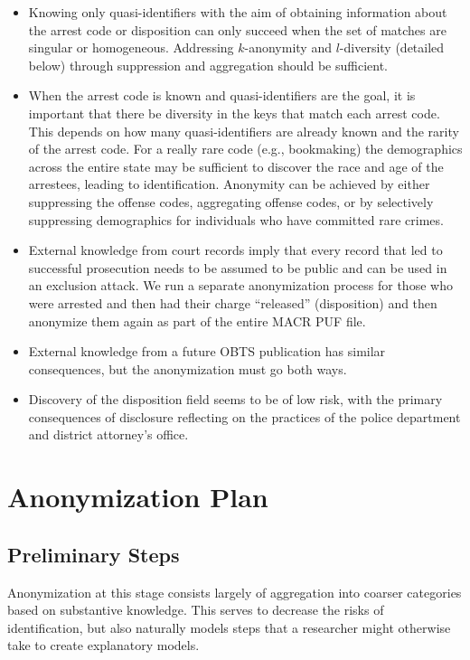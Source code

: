 \documentclass[]{article}
\providecommand{\tightlist}{%
  \setlength{\itemsep}{0pt}\setlength{\parskip}{0pt}}
\begin{document}
\begin{itemize}
\tightlist
\item
  Knowing only quasi-identifiers with the aim of obtaining information
  about the arrest code or disposition can only succeed when the set of
  matches are singular or homogeneous. Addressing \(k\)-anonymity and
  \(l\)-diversity (detailed below) through suppression and aggregation
  should be sufficient.
\item
  When the arrest code is known and quasi-identifiers are the goal, it
  is important that there be diversity in the keys that match each
  arrest code. This depends on how many quasi-identifiers are already
  known and the rarity of the arrest code. For a really rare code (e.g.,
  bookmaking) the demographics across the entire state may be sufficient
  to discover the race and age of the arrestees, leading to
  identification. Anonymity can be achieved by either suppressing the
  offense codes, aggregating offense codes, or by selectively
  suppressing demographics for individuals who have committed rare
  crimes.
\item
  External knowledge from court records imply that every record that led
  to successful prosecution needs to be assumed to be public and can be
  used in an exclusion attack. We run a separate anonymization process
  for those who were arrested and then had their charge ``released''
  (disposition) and then anonymize them again as part of the entire MACR
  PUF file.
\item
  External knowledge from a future OBTS publication has similar
  consequences, but the anonymization must go both ways.
\item
  Discovery of the disposition field seems to be of low risk, with the
  primary consequences of disclosure reflecting on the practices of the
  police department and district attorney's office.
\end{itemize}

\section{Anonymization Plan}\label{anonymization-plan}

\subsection{Preliminary Steps}\label{preliminary-steps}

Anonymization at this stage consists largely of aggregation into coarser
categories based on substantive knowledge. This serves to decrease the
risks of identification, but also naturally models steps that a
researcher might otherwise take to create explanatory models.
\end{document}

